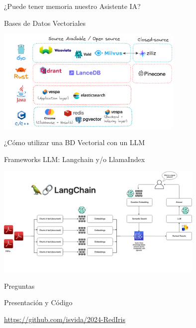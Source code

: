 \documentclass[table, unknownkeysallowed, 10pt]{beamer}
\begin{document}
\begin{frame}{¿Puede tener memoria nuestro Asistente IA?}

    \begin{block}{Bases de Datos Vectoriales}
    \begin{center}
        \includegraphics[width=9cm]{imagenes/tiposVectorDB.png}
    \end{center}
\end{block}
\end{frame}

\begin{frame}{¿Cómo utilizar una BD Vectorial con un LLM}
    \begin{block}{Frameworks LLM: Langchain y/o LlamaIndex}
    \begin{center}
        \includegraphics[width=10cm]{imagenes/langchain.png}
    \end{center}
\end{block}
\end{frame}

\begin{frame}{Preguntas}
    \begin{block}{Presentación y Código}
    \begin{center}
        \href{https://github.com/isvida/2024-RedIris}{https://github.com/isvida/2024-RedIris}
    \end{center}
\end{block}
\end{frame}
\end{document}
